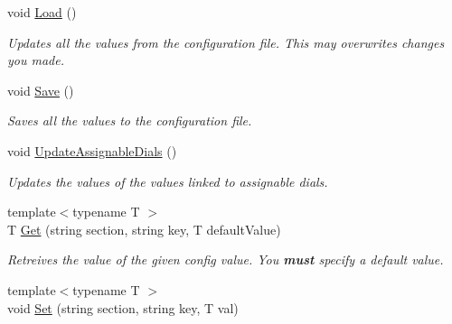 \begin{DoxyCompactItemize}
\item 
\hypertarget{class_config_a99b19da81af9603ca95103b375d5bd90}{
void \hyperlink{class_config_a99b19da81af9603ca95103b375d5bd90}{\-Load} ()}
\label{class_config_a99b19da81af9603ca95103b375d5bd90}

\begin{DoxyCompactList}\small\item\em \-Updates all the values from the configuration file. \-This may overwrites changes you made. \end{DoxyCompactList}\item 
\hypertarget{class_config_ab04c51d227c1457404ae9dadc1c576e1}{
void \hyperlink{class_config_ab04c51d227c1457404ae9dadc1c576e1}{\-Save} ()}
\label{class_config_ab04c51d227c1457404ae9dadc1c576e1}

\begin{DoxyCompactList}\small\item\em \-Saves all the values to the configuration file. \end{DoxyCompactList}\item 
\hypertarget{class_config_a2064e621e224d1f6053ef7fabe4d4045}{
void \hyperlink{class_config_a2064e621e224d1f6053ef7fabe4d4045}{\-Update\-Assignable\-Dials} ()}
\label{class_config_a2064e621e224d1f6053ef7fabe4d4045}

\begin{DoxyCompactList}\small\item\em \-Updates the values of the values linked to assignable dials. \end{DoxyCompactList}\item 
\hypertarget{class_config_ae2af4140fa3482e07978c8f8f023b42d}{
{\footnotesize template$<$typename T $>$ }\\\-T \hyperlink{class_config_ae2af4140fa3482e07978c8f8f023b42d}{\-Get} (string section, string key, \-T default\-Value)}
\label{class_config_ae2af4140fa3482e07978c8f8f023b42d}

\begin{DoxyCompactList}\small\item\em \-Retreives the value of the given config value. \-You {\bfseries must} specify a default value. \end{DoxyCompactList}\item 
\hypertarget{class_config_a5d9210c988409c7a95c1c9d0c293daa3}{
{\footnotesize template$<$typename T $>$ }\\void \hyperlink{class_config_a5d9210c988409c7a95c1c9d0c293daa3}{\-Set} (string section, string key, \-T val)}
\label{class_config_a5d9210c988409c7a95c1c9d0c293daa3}


\end{DoxyCompactItemize}
